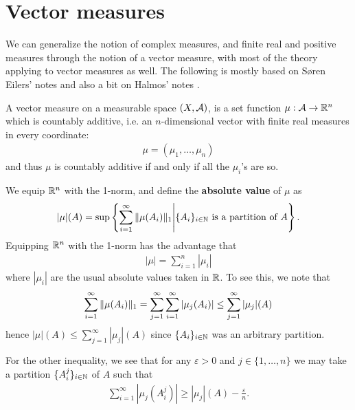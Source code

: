 \documentclass[../../main.tex]{subfiles}
\begin{document}
\section{Vector measures}

We can generalize the notion of complex measures, and finite real and positive measures through the notion of a vector measure, with most of the theory applying to vector measures as well. The following is mostly based on Søren Eilers' notes \cite{BergEilers} %
and also a bit on Halmos' notes \cite{Halmos}.



\begin{definition} %
A vector measure on a measurable space $(X, \m{A})$, is a set function $\mu:\m{A} \to \R^{n}$ which is countably additive, i.e. an $n$-dimensional vector with finite real measures in every coordinate:
\begin{align*}
	\mu=(\mu_{1}, \dots, \mu_{n})
\end{align*}
and thus $\mu$ is countably additive if and only if all the $\mu_{i}$'s are so.
\end{definition}



We equip $\R^{n}$ with the 1-norm, and define the \textbf{absolute value} of $\mu$ as
\begin{align*}
	| \mu | (A) = \sup \left\{ \sum_{i=1}^{\infty} \norm[1]{\mu(A_{i})} \middle| \{ A_{i} \}_{i\in \N} \text{ is a partition of } A \right\}.
\end{align*}
Equipping $\R^{n}$ with the 1-norm has the advantage that
\begin{align}
	|\mu | = \sum_{i=1}^{n} |\mu_{i}| \label{eq: one norm}
\end{align}
where $|\mu_{i}|$ are the usual absolute values taken in $\R$. To see this, we note that
\begin{align*}
	\sum_{i=1}^{\infty} \norm[1]{\mu(A_{i})} = \sum_{j=1}^{\infty} \sum_{i=1}^{\infty} | \mu_{j}(A_{i}) | \le \sum_{j=1}^{\infty} |\mu_{j}|(A)
\end{align*}
hence $|\mu|(A) \le \sum_{j=1}^{\infty} |\mu_{j}|(A)$ since $\{A_{i}\}_{i\in \N}$ was an arbitrary partition.

For the other inequality, we see that for any $\varepsilon>0$ and $j\in \{1, \dots, n\}$ we may take a partition $\{A_{i}^{j}\}_{i\in \N}$ of $A$ such that
\begin{align*}
	\sum_{i=1}^{\infty} | \mu_{j}(A_{i}^{j}) | \ge | \mu_{j}| (A) - \frac{\varepsilon}{n}.
\end{align*}
\end{document}
